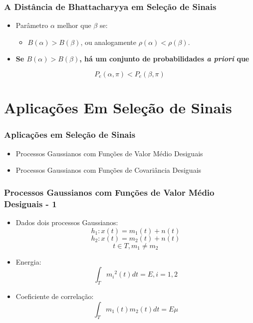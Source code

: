 \documentclass{beamer}
\begin{document}
\begin{frame}
	
	\frametitle{A Distância de Bhattacharyya em Seleção de Sinais}
	
	\begin{itemize}
		\setlength\itemsep{1em}
		\item Parâmetro $\alpha$ melhor que $\beta$ se:
		\begin{itemize}
			\item $B(\alpha) > B(\beta)$, ou analogamente $\rho(\alpha) < \rho(\beta)$.
		\end{itemize}		 
		\item \textbf{Se $B(\alpha) > B(\beta)$, há um conjunto de probabilidades \textit{a priori} que}
	\end{itemize}
$$ P_e(\alpha,\pi) < P_e(\beta,\pi) $$


\end{frame}

\begin{comment}

\begin{frame}
	\justifying
	\frametitle{Teorema de Blackwell}

  
\end{frame}

\end{comment}



\section{Aplicações Em Seleção de Sinais}

\begin{frame}
    \frametitle{Aplicações em Seleção de Sinais}
    
    \begin{itemize}
    	\setlength\itemsep{2em}
        \item Processos Gaussianos com Funções de Valor Médio Desiguais
    	\item Processos Gaussianos com Funções de Covariância Desiguais
	\end{itemize}
    
\end{frame}


\begin{frame}
	\frametitle{Processos Gaussianos com Funções de Valor Médio Desiguais - 1}
	
	\begin{itemize}
		\item[] Dados dois processos Gaussianos: $$ h_1:x(t) = m_1(t) + n(t)$$ $$ h_2:x(t) = m_2(t) + n(t)$$ $$ t \in T, m_1 \neq m_2$$
		
		
		\item[] Energia:		$$ \int_{T}^{} {m_i}^2(t)dt = E, i=1,2 $$
		\item[] Coeficiente de correlação:		$$ \int_{T}^{} m_1(t)m_2(t)dt = E\mu $$
	\end{itemize}
\end{frame}
\end{document}
